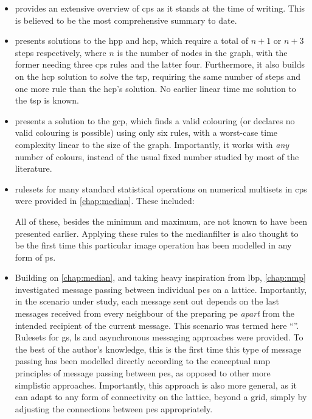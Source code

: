 \begin{itemize}
    \item {} provides an extensive overview of \gls{cps} as it stands at the time of writing.  This is believed to be the most comprehensive summary to date.
    \item {} presents solutions to the \gls{hpp} and \gls{hcp}, which require a total of \(n + 1\) or \(n + 3\) steps respectively, where \(n\) is the number of nodes in the graph, with the former needing three \gls{cps} rules and the latter four.  Furthermore, it also builds on the \gls{hcp} solution to solve the \gls{tsp}, requiring the same number of steps and one more rule than the \gls{hcp}'s solution.  No earlier linear time \gls{mc} solution to the \gls{tsp} is known.
    \item {} presents a solution to the \gls{gcp}, which finds a valid colouring (or declares no valid colouring is possible) using only six rules, with a worst-case time complexity linear to the size of the graph.  Importantly, it works with \emph{any} number of colours, instead of the usual fixed number studied by most of the literature.
    \item \Glspl{ruleset} for many standard statistical operations on numerical multisets in \gls{cps} were provided in \cref{chap:median}.  These included:
    All of these, besides the minimum and maximum, are not known to have been presented earlier.  Applying these rules to the \gls{medianfilter} is also thought to be the first time this particular image operation has been modelled in any form of \gls{ps}.
    \item Building on \cref{chap:median}, and taking heavy inspiration from \gls{lbp}, \cref{chap:nmp} investigated message passing between individual \glspl{pe} on a lattice. Importantly, in the scenario under study, each message sent out depends on the last messages received from every neighbour of the preparing \gls{pe} \emph{apart} from the intended recipient of the current message.  This scenario was termed here ``''.  Rulesets for \gls{gs}, \gls{ls} and asynchronous messaging approaches were provided.  To the best of the author's knowledge, this is the first time this type of message passing has been modelled directly according to the conceptual \gls{nmp} principles of message passing between \glspl{pe}, as opposed to other more simplistic approaches.  Importantly, this approach is also more general, as it can adapt to any form of connectivity on the lattice, beyond a grid, simply by adjusting the connections between \glspl{pe} appropriately.

\end{itemize}
